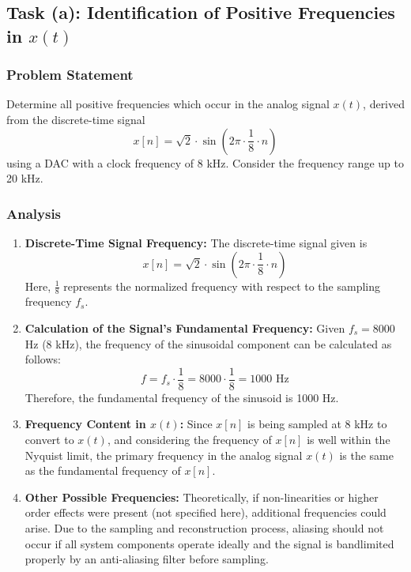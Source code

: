 
\item[(a)]
\subsection{Task (a): Identification of Positive Frequencies in $x(t)$}

\subsubsection{Problem Statement}
Determine all positive frequencies which occur in the analog signal $x(t)$, derived from the discrete-time signal
$$
x[n] = \sqrt{2} \cdot \sin \left(2 \pi \cdot \frac{1}{8} \cdot n\right)
$$
using a DAC with a clock frequency of 8 kHz. Consider the frequency range up to 20 kHz.

\subsubsection{Analysis}
\begin{enumerate}
    \item \textbf{Discrete-Time Signal Frequency:}
    The discrete-time signal given is
    $$
    x[n] = \sqrt{2} \cdot \sin \left(2 \pi \cdot \frac{1}{8} \cdot n\right)
    $$
    Here, $\frac{1}{8}$ represents the normalized frequency with respect to the sampling frequency $f_s$.

    \item \textbf{Calculation of the Signal's Fundamental Frequency:}
    Given $f_s = 8000$ Hz (8 kHz), the frequency of the sinusoidal component can be calculated as follows:
    $$
    f = f_s \cdot \frac{1}{8} = 8000 \cdot \frac{1}{8} = 1000 \text{ Hz}
    $$
    Therefore, the fundamental frequency of the sinusoid is 1000 Hz.

    \item \textbf{Frequency Content in $x(t)$:}
    Since $x[n]$ is being sampled at 8 kHz to convert to $x(t)$, and considering the frequency of $x[n]$ is well within the Nyquist limit, the primary frequency in the analog signal $x(t)$ is the same as the fundamental frequency of $x[n]$.

    \item \textbf{Other Possible Frequencies:}
    Theoretically, if non-linearities or higher order effects were present (not specified here), additional frequencies could arise. Due to the sampling and reconstruction process, aliasing should not occur if all system components operate ideally and the signal is bandlimited properly by an anti-aliasing filter before sampling.
\end{enumerate}


